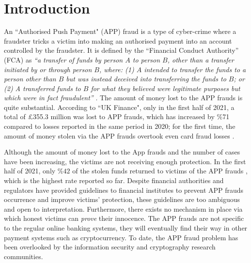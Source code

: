

\section{Introduction}

An ``Authorised Push Payment" (APP) fraud is a type of cyber-crime where a fraudster tricks a victim into making an authorised payment into an account controlled by the fraudster. It is defined by the ``Financial Conduct Authority” (FCA) as \textit{``a transfer of funds by person $A$ to person $B$, other than a transfer initiated by or through person $B$, where: (1) $A$ intended to transfer the funds to a person other than $B$ but was instead deceived into transferring the funds to $B$; or (2) A transferred funds to $B$ for what they believed were legitimate purposes but which were in fact fraudulent''} \cite{FCA-Glossary}. The amount of money lost to the APP frauds is quite  substantial. According to  ``UK Finance",   only in the first half of 2021, a total of £355.3 million was lost to APP frauds, which has increased by  \%71  compared to losses reported in the same period in 2020; for the first time, the amount of money stolen via the APP frauds overtook even   card fraud losses \cite{2021-Half-Year-Fraud-Update}.



Although the amount of money lost to the App frauds and the number of cases have been increasing, the victims are not receiving  enough protection.   In the first half of 2021, only $\%42$ of the stolen funds returned to victims of the APP frauds \cite{2021-Half-Year-Fraud-Update}, which is the highest rate reported so far. Despite   financial authorities and regulators have provided  guidelines to financial institutes to prevent  APP frauds occurrence and improve victims' protection, these guidelines are too ambiguous and    open to interpretation. Furthermore,  there exists  no  mechanism in place via which honest victims can  \emph{prove} their innocence. The APP frauds are not specific to the regular online banking systems, they will eventually find their way in other payment systems such as cryptocurrency. To date, the APP fraud problem has been overlooked by the information security and cryptography research communities.


